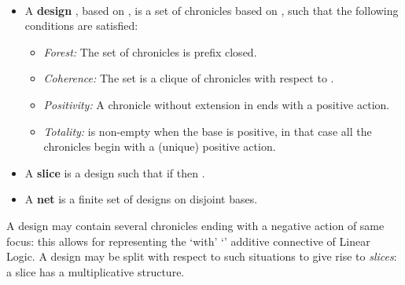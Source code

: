 \documentclass{LMCS}
\begin{document}
\begin{defi}~
  \begin{itemize}
\item[] A {\bf design} , based on
  , is a set of chronicles based on
  , such that the following conditions are
  satisfied:
\begin{itemize}[label=]
\item  {\em Forest:} The set of chronicles is prefix closed.
\item  {\em Coherence:} The set is a clique of chronicles with respect to . 
\item {\em Positivity:} A chronicle without extension in  ends with a positive action.
\item {\em Totality:}  is non-empty when the base is positive, in that case all the chronicles begin with a (unique) positive action.
\end{itemize}
\item[]  A {\bf slice} is a design  such that if  then . 
\item[]  A {\bf net} is a finite set of designs on disjoint bases. 
\end{itemize}
\end{defi}

A design may contain several chronicles ending with a negative action of same focus: this allows for representing the `with' `' additive connective of Linear Logic. A design may be split with respect to such situations to give rise to {\em slices}: a slice has a multiplicative structure.
\end{document}
